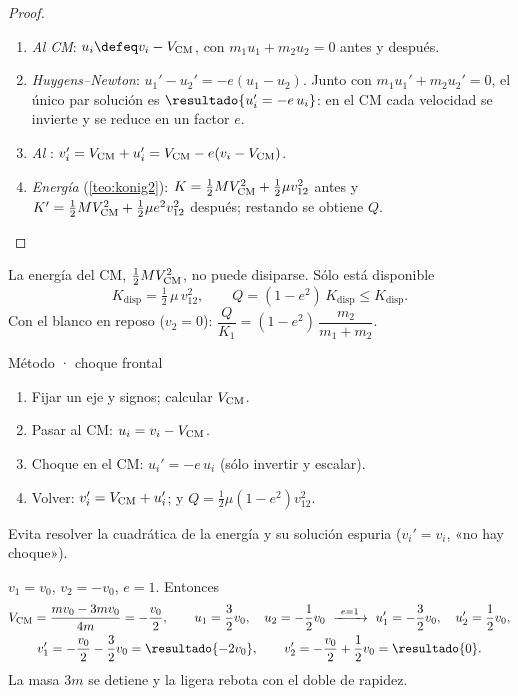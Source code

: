 \begin{proof}
\begin{enumerate}
  \item \emph{Al CM}: $u_{i}\defeq v_{i}-V\cm$, con $m_{1}u_{1}+m_{2}u_{2}=0$ antes y después.
  \item \emph{Huygens--Newton}: $u_{1}'-u_{2}'=-e(u_{1}-u_{2})$. Junto con $m_{1}u_{1}'+m_{2}u_{2}'=0$, el
        único par solución es $\resultado{u_{i}'=-e\,u_{i}}$: en el CM cada velocidad se invierte y se reduce en un factor $e$.
  \item \emph{Al \lab}: $v_{i}'=V_{\mathrm{CM}}+u_{i}'=V_{\mathrm{CM}}-e(v_{i}-V_{\mathrm{CM}})$.
  \item \emph{Energía} (\cref{teo:konig2}): $K=\tfrac12MV_{\mathrm{CM}}^{2}+\tfrac12\mu v_{12}^{2}$ antes y
        $K'=\tfrac12MV_{\mathrm{CM}}^{2}+\tfrac12\mu e^{2}v_{12}^{2}$ después; restando se obtiene $Q$.\qedhere
\end{enumerate}
\end{proof}

\begin{corolario}
\label{cor:disponible}
La energía del CM, $\tfrac12MV_{\mathrm{CM}}^{2}$, no puede disiparse. Sólo está disponible
\begin{equation}
  K_{\mathrm{disp}}=\tfrac12\,\mu\,v_{12}^{2},\qquad Q=(1-e^{2})\,K_{\mathrm{disp}}\le K_{\mathrm{disp}} .
\end{equation}
Con el blanco en reposo ($v_{2}=0$): $\dfrac{Q}{K_{1}}=(1-e^{2})\,\dfrac{m_{2}}{m_{1}+m_{2}}$.
\end{corolario}

\begin{clave}{Método · choque frontal}
\begin{enumerate}[leftmargin=1.4em]
  \item Fijar un eje y signos; calcular $V_{\mathrm{CM}}$.
  \item Pasar al CM: $u_{i}=v_{i}-V_{\mathrm{CM}}$.
  \item Choque en el CM: $u_{i}'=-e\,u_{i}$ (sólo invertir y escalar).
  \item Volver: $v_{i}'=V_{\mathrm{CM}}+u_{i}'$; y $Q=\tfrac12\mu(1-e^{2})v_{12}^{2}$.
\end{enumerate}
Evita resolver la cuadrática de la energía y su solución espuria ($v_{i}'=v_{i}$, «no hay choque»).
\end{clave}

\begin{ejemplo}
\label{ej:m3m}
$v_{1}=v_{0}$, $v_{2}=-v_{0}$, $e=1$. Entonces
\begin{gather*}
  V\cm=\frac{mv_{0}-3mv_{0}}{4m}=-\frac{v_{0}}{2},\qquad
  u_{1}=\frac32v_{0},\quad u_{2}=-\frac12v_{0}
  \ \xrightarrow{\ e=1\ }\ u_{1}'=-\frac32v_{0},\quad u_{2}'=\frac12v_{0},\\
  v_{1}'=-\frac{v_{0}}2-\frac32v_{0}=\resultado{-2v_{0}},\qquad
  v_{2}'=-\frac{v_{0}}2+\frac12v_{0}=\resultado{0} .
\end{gather*}
La masa $3m$ se detiene y la ligera rebota con el doble de rapidez.
\end{ejemplo}

